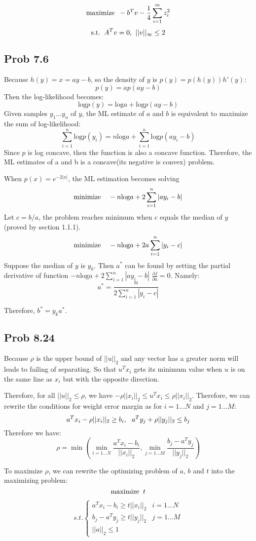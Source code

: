 \documentclass[10pt,a4paper]{article}
\begin{document}
$$\text{maximize\;\;} -b^Tv-\frac{1}{4}\sum_{i=1}^{m}z_i^2$$
$$\text{s.t.\;\;} A^Tv=0\text{,\;\;} ||v||_{\infty}\leq 2$$

\subsection{Prob 7.6}

Because $h(y)=x=ay-b$, so the density of $y$ is
$p(y)=p(h(y))h'(y)$:
$$p(y)= ap(ay-b)$$ 
Then the log-likelihood becomes:
$$ \text{log}p(y) = \text{log}a + \text{log}p(ay-b)$$
Given samples $y_1\dots y_n$ of $y$, the ML estimate of $a$
and $b$ is equivalent to maximize the sum of log-likelihood:
$$\sum_{i=1}^{n}\text{log}p(y_i)=n\text{log}a+\sum_{i=1}^{n}\text{log}p(ay_i-b)$$
Since $p$ is log concave, then the function is also a
concave function. Therefore, the ML estimates of a and b is
a concave(its negative is convex) problem.

When $p(x)=e^{-2|x|}$, the ML estimation becomes solving
$$ \text{minimize\;\;\;\;}-n\text{log}a+2\sum_{i=1}^{n}|ay_i-b|$$
Let $c=b/a$, the problem reaches minimum when $c$ equals the
median of $y$ (proved by section 1.1.1). 
$$ \text{minimize\;\;\;\;}-n\text{log}a+2a\sum_{i=1}^{n}|y_i-c|$$
Suppose the median of $y$ is $y_k$. Then $a^*$ can be found
by setting the partial derivative of function
$-n\text{log}a+2\sum_{i=1}^{n}|ay_i-b|$ $\frac{\partial
  f}{\partial a}=0$. Namely: 
$$a^* = \frac{n}{2\sum_{i=1}^{n}|y_i-c|}$$

Therefore, $b^*=y_ka^*$.


\subsection{Prob 8.24}
Because $\rho$ is the upper bound of $||u||_2$ and any
vector has a greater norm will leads to failing of
separating. So that $u^Tx_i$ gets its minimum value when $u$
is on the same line as $x_i$ but with the opposite
direction.

Therefore, for all $||u||_2\leq \rho$, we have $-\rho ||x_i||_2 \leq
u^Tx_i\leq \rho ||x_i||_2$. Therefore, we can rewrite the
conditions for weight error margin as for $i=1\dots N$ and
$j=1\dots M$:
$$
a^Tx_i-\rho||x_i||_2\geq b_i \text{,\;\;\;}
a^Ty_j+\rho||y_j||_2\leq b_j
$$
Therefore we have:
$$\rho = \min(\min_{i=1\dots
  N}{\frac{a^Tx_i-b_i}{||x_i||_2}},\min_{j=1\dots M}{\frac{b_j-a^Ty_j}{||y_j||_2}})$$

To maximize $\rho$, we can rewrite the optimizing problem of $a$, $b$ and $t$ into the maximizing
problem:
$$\text{maximize\;\;}t$$
\begin{align*}
  s.t.
  \begin{cases}
    a^Tx_i-b_i\geq t||x_i||_2 & i=1\dots N\\
    b_j-a^Ty_j\geq t||y_j||_2 & j=1\dots M\\
    ||a||_2\leq 1
\end{cases}
\end{align*}




	\renewcommand\refname{Bibliography}
	
	
\end{document}
